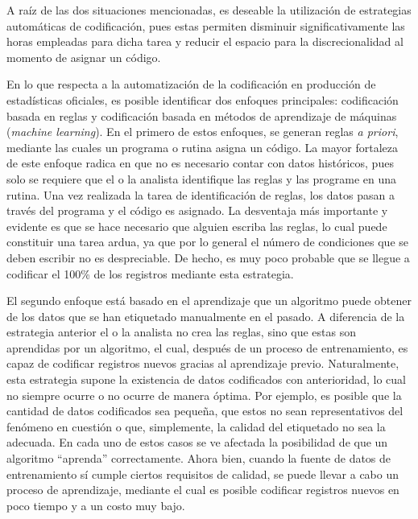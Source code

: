 \documentclass[
  12pt,
  spanish,
]{article}
\begin{document}
A raíz de las dos situaciones mencionadas, es deseable la utilización de
estrategias automáticas de codificación, pues estas permiten disminuir
significativamente las horas empleadas para dicha tarea y reducir el
espacio para la discrecionalidad al momento de asignar un código.

En lo que respecta a la automatización de la codificación en producción
de estadísticas oficiales, es posible identificar dos enfoques
principales: codificación basada en reglas y codificación basada en
métodos de aprendizaje de máquinas (\emph{machine learning}). En el
primero de estos enfoques, se generan reglas \emph{a priori}, mediante
las cuales un programa o rutina asigna un código. La mayor fortaleza de
este enfoque radica en que no es necesario contar con datos históricos,
pues solo se requiere que el o la analista identifique las reglas y las
programe en una rutina. Una vez realizada la tarea de identificación de
reglas, los datos pasan a través del programa y el código es asignado.
La desventaja más importante y evidente es que se hace necesario que
alguien escriba las reglas, lo cual puede constituir una tarea ardua, ya
que por lo general el número de condiciones que se deben escribir no es
despreciable. De hecho, es muy poco probable que se llegue a codificar
el 100\% de los registros mediante esta estrategia.

El segundo enfoque está basado en el aprendizaje que un algoritmo puede
obtener de los datos que se han etiquetado manualmente en el pasado. A
diferencia de la estrategia anterior el o la analista no crea las
reglas, sino que estas son aprendidas por un algoritmo, el cual, después
de un proceso de entrenamiento, es capaz de codificar registros nuevos
gracias al aprendizaje previo. Naturalmente, esta estrategia supone la
existencia de datos codificados con anterioridad, lo cual no siempre
ocurre o no ocurre de manera óptima. Por ejemplo, es posible que la
cantidad de datos codificados sea pequeña, que estos no sean
representativos del fenómeno en cuestión o que, simplemente, la calidad
del etiquetado no sea la adecuada. En cada uno de estos casos se ve
afectada la posibilidad de que un algoritmo ``aprenda'' correctamente.
Ahora bien, cuando la fuente de datos de entrenamiento sí cumple ciertos
requisitos de calidad, se puede llevar a cabo un proceso de aprendizaje,
mediante el cual es posible codificar registros nuevos en poco tiempo y
a un costo muy bajo.
\end{document}
